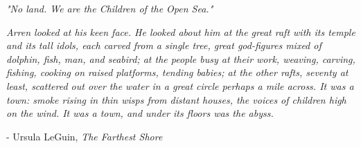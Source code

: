 \documentclass[10pt]{article}
\begin{document}
\begin{textblock}{9}
\textit{"No land. We are the Children of the Open Sea."}

\textit{Arren looked at his keen face. He looked about him at the great raft
with its temple and its tall idols, each carved from a single tree, great
god-figures mixed of dolphin, fish, man, and seabird; at the people busy at
their work, weaving, carving, fishing, cooking on raised platforms, tending
babies; at the other rafts, seventy at least, scattered out over the water in a
great circle perhaps a mile across. It was a town: smoke rising in thin wisps
from distant houses, the voices of children high on the wind. It was a town,
and under its floors was the abyss.}

- Ursula LeGuin, \emph{The Farthest Shore}

\end{textblock}
\end{document}
